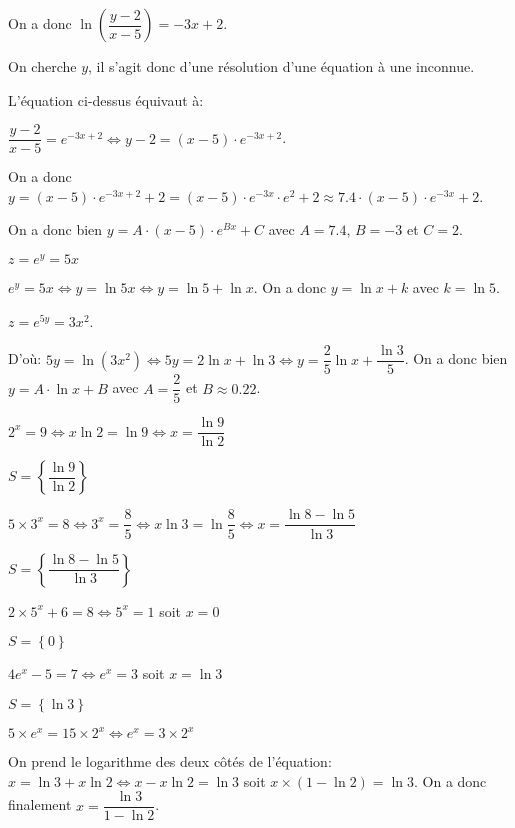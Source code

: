\documentclass[a4paper,12pt]{scrartcl}
\begin{document}
On a donc $\ln \left( \dfrac{y-2}{x-5} \right) = -3x + 2$.

On cherche $y$, il s'agit donc d'une résolution d'une équation à une inconnue.

L'équation ci-dessus équivaut à:

$\dfrac{y-2}{x-5} = e^{-3x + 2} \Leftrightarrow y-2 = (x-5)\cdot e^{-3x + 2}$.

On a donc $y = (x-5)\cdot e^{-3x + 2}+2 = (x-5)\cdot e^{-3x}\cdot e^2+2 \approx 7.4\cdot(x-5)\cdot e^{-3x} + 2$.

On a donc bien $y = A\cdot(x-5)\cdot e^{Bx} + C$ avec $A = 7.4$, $B = -3$ et $C = 2$.

\exo{}

$z = e^y = 5x$

$e^y = 5x \Leftrightarrow y = \ln 5x \Leftrightarrow y = \ln 5 + \ln x$. On a donc $y = \ln x + k$ avec $k = \ln 5$.

\exo{}

$z = e^{5y} = 3x^2$. 

D'où: $5y = \ln(3x^2) \Leftrightarrow 5y = 2 \ln x + \ln 3 \Leftrightarrow y = \dfrac{2}{5} \ln x + \dfrac{\ln 3}{5}$. On a donc bien $y = A \cdot \ln x + B$ avec $A = \dfrac{2}{5}$ et $B \approx 0.22$.

\setcounter{exos}{1}


\question{}
$2^x = 9 \Leftrightarrow x \ln 2 = \ln 9 \Leftrightarrow x = \dfrac{\ln 9}{\ln 2}$

$S = \left\lbrace \dfrac{\ln 9}{\ln 2} \right\rbrace$

\question{}
$5 \times 3^x = 8 \Leftrightarrow 3^x = \dfrac{8}{5} \Leftrightarrow x \ln 3 = \ln \dfrac{8}{5} \Leftrightarrow x = \dfrac{\ln 8 - \ln 5}{\ln 3}$

$S = \left\lbrace \dfrac{\ln 8 - \ln 5}{\ln 3} \right\rbrace$

\question{}
$2 \times 5^x + 6 = 8 \Leftrightarrow 5^x = 1$ soit $x = 0$

$S = \left\lbrace 0 \right\rbrace$

\question{}
$4 e^x - 5 = 7 \Leftrightarrow e^x = 3$ soit $x = \ln 3$

$S = \left\lbrace \ln 3 \right\rbrace$

\question{}
$5 \times e^x = 15 \times 2^x \Leftrightarrow e^x = 3 \times 2^x$

On prend le logarithme des deux côtés de l'équation: $x = \ln 3 + x \ln 2 \Leftrightarrow x - x \ln 2 = \ln 3$ soit $x \times (1-\ln 2) = \ln 3$. On a donc finalement $x = \dfrac{\ln 3}{1-\ln 2}$.
\end{document}
